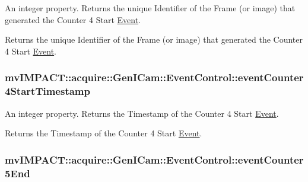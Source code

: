 An integer property. Returns the unique Identifier of the Frame (or image) that generated the Counter 4 Start \hyperlink{classmv_i_m_p_a_c_t_1_1acquire_1_1_event}{Event}. 

Returns the unique Identifier of the Frame (or image) that generated the Counter 4 Start \hyperlink{classmv_i_m_p_a_c_t_1_1acquire_1_1_event}{Event}. \hypertarget{classmv_i_m_p_a_c_t_1_1acquire_1_1_gen_i_cam_1_1_event_control_a44a6ff90746365b8b27a1814dcf37113}{
\subsubsection[{event\+Counter4\+Start\+Timestamp}]{ mv\+I\+M\+P\+A\+C\+T\+::acquire\+::\+Gen\+I\+Cam\+::\+Event\+Control\+::event\+Counter4\+Start\+Timestamp}}\label{classmv_i_m_p_a_c_t_1_1acquire_1_1_gen_i_cam_1_1_event_control_a44a6ff90746365b8b27a1814dcf37113}


An integer property. Returns the Timestamp of the Counter 4 Start \hyperlink{classmv_i_m_p_a_c_t_1_1acquire_1_1_event}{Event}. 

Returns the Timestamp of the Counter 4 Start \hyperlink{classmv_i_m_p_a_c_t_1_1acquire_1_1_event}{Event}. \hypertarget{classmv_i_m_p_a_c_t_1_1acquire_1_1_gen_i_cam_1_1_event_control_ae0adafbbc307d6e7e86739432ad0d582}{
\subsubsection[{event\+Counter5\+End}]{ mv\+I\+M\+P\+A\+C\+T\+::acquire\+::\+Gen\+I\+Cam\+::\+Event\+Control\+::event\+Counter5\+End}}\label{classmv_i_m_p_a_c_t_1_1acquire_1_1_gen_i_cam_1_1_event_control_ae0adafbbc307d6e7e86739432ad0d582}


